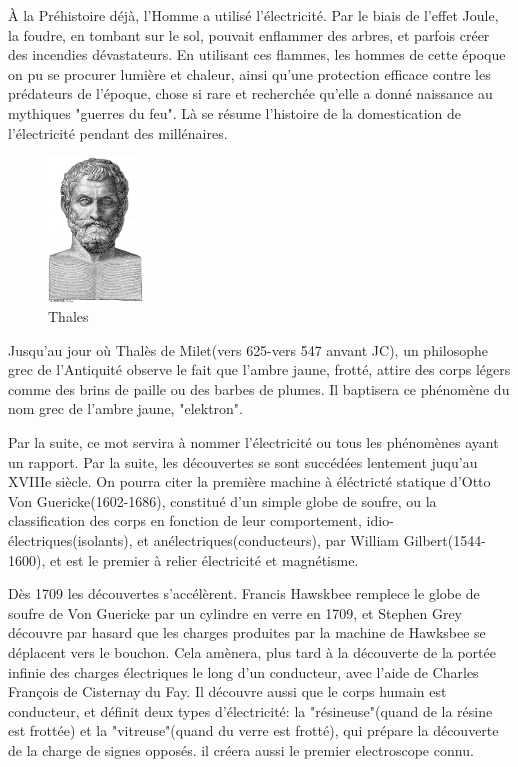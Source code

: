 \documentclass[12pt]{report}
\begin{document}
	    À la Préhistoire déjà, l'Homme a utilisé l'électricité. Par le biais de l'effet Joule, la foudre, en tombant sur le sol, pouvait enflammer des arbres, et parfois créer des incendies dévastateurs. En utilisant ces flammes, les hommes de cette époque on pu se procurer lumière et chaleur, ainsi qu'une protection efficace contre les prédateurs de l'époque, chose si rare et recherchée qu'elle a donné naissance au mythiques "guerres du feu". Là se résume l'histoire de la domestication de l'électricité pendant des millénaires.
\begin{figure}
  \begin{center}
    \includegraphics[width=0.225\textwidth]{thales}
  \end{center}
  \caption{Thales}
\end{figure} Jusqu'au jour où Thalès de Milet(vers 625-vers 547 anvant JC), un philosophe grec de l'Antiquité observe le fait que l'ambre jaune, frotté, attire des corps légers comme des brins de paille ou des barbes de plumes. Il baptisera ce phénomène du nom grec de l'ambre jaune, "elektron".

  Par la suite, ce mot servira à nommer l'électricité ou tous les phénomènes ayant un rapport. Par la suite, les découvertes se sont succédées lentement juqu'au XVIIIe siècle. On pourra citer la première machine à éléctricté statique d'Otto Von Guericke(1602-1686), constitué d'un simple globe de soufre, ou la classification des corps en fonction de leur comportement, idio-électriques(isolants), et anélectriques(conducteurs), par William Gilbert(1544-1600), et est le premier à relier électricité et magnétisme.

    Dès 1709 les découvertes s'accélèrent. Francis Hawskbee remplece le globe de soufre de Von Guericke par un cylindre en verre en 1709, et Stephen Grey découvre par hasard que les charges produites par la machine de Hawksbee se déplacent vers le bouchon. Cela amènera, plus tard à la découverte de la portée infinie des charges électriques le long d'un conducteur, avec l'aide de Charles François de Cisternay du Fay. Il découvre aussi que le corps humain est conducteur, et définit deux types d'électricité: la "résineuse"(quand de la résine est frottée) et la "vitreuse"(quand du verre est frotté), qui prépare la découverte de la charge de signes opposés. il créera aussi le premier electroscope connu.
\end{document}
